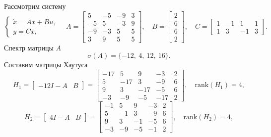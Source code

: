 Рассмотрим систему
\begin{equation}
    \begin{cases}
        \dot x=Ax+Bu,\\
        y=Cx,
    \end{cases}\quad
    A=\begin{bmatrix}
        5&-5&-9&3\\
        -5&5&-3&9\\
        -9&-3&5&5\\
        3&9&5&5
    \end{bmatrix},\quad 
    B=\begin{bmatrix}
        2\\6\\6\\2
    \end{bmatrix},\quad
    C=\begin{bmatrix}
        1&-1&1&1\\
        1&3&-1&3
    \end{bmatrix}.
    \label{eq:sys2}
\end{equation}
Спектр матрицы $A$
\begin{equation*}
    \sigma(A)=\{ -12,\ 4,\ 12,\ 16 \}.
\end{equation*}
Составим матрицы Хаутуса
\begin{equation*}
    H_1 = \begin{bmatrix}
        -12 I - A & B
    \end{bmatrix} =
    \begin{bmatrix}
        -17 & 5  & 9  & -3 & 2  \\
         5  & -17 & 3  & -9 & 6  \\
         9  & 3  & -17 & -5 & 6  \\
        -3  & -9 & -5  & -17 & 2
    \end{bmatrix},
    \quad\text{rank}(H_1) = 4,
\end{equation*}
\begin{equation*}
    H_2 = \begin{bmatrix}
        4 I - A & B
    \end{bmatrix} =
    \begin{bmatrix}
        -1 & 5 & 9 & -3 & 2 \\
         5 & -1 & 3 & -9 & 6 \\
         9 & 3 & -1 & -5 & 6 \\
        -3 & -9 & -5 & -1 & 2
    \end{bmatrix},
    \quad\text{rank}(H_2) = 4,
\end{equation*}
